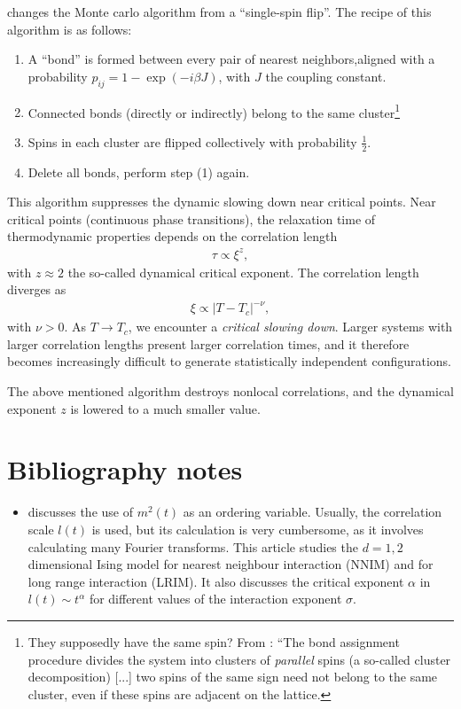 \cite{PhysRevLett.58.86} changes the Monte carlo
algorithm from a ``single-spin flip''. The recipe of this algorithm is as follows:

\begin{enumerate}
	\item A ``bond'' is formed between every pair of nearest neighbors,aligned with a probability $p_{ij} = 1 - \exp(-i\beta J)$, with $J$ the coupling constant.
	\item Connected bonds (directly or indirectly) belong to the same cluster\footnote{They supposedly have the same spin? From \cite{Luijten2006}: ``The bond assignment procedure divides the system into clusters of \textit{parallel} spins (a so-called cluster decomposition) [...] two spins of the same sign need not belong to the same cluster, even if these spins are adjacent on the lattice. }
	\item Spins in each cluster are flipped collectively with probability $\frac{1}{2}$. 
	\item Delete all bonds, perform step (1) again.
\end{enumerate}

This algorithm suppresses the dynamic slowing down near critical points. Near critical points (continuous phase transitions), the relaxation time of thermodynamic properties depends on the correlation length 
\begin{align}
	\tau \propto \xi ^z,
\end{align}
with $z\approx2$ the so-called dynamical critical exponent. The correlation length diverges as 
\begin{align}
	\xi \propto \lvert T - T_c \rvert ^{-\nu},
\end{align}
with $\nu > 0 $. As $T\to T_c$, we encounter a \textit{critical slowing down}. Larger systems with larger correlation lengths present larger correlation times, and it therefore becomes increasingly difficult to generate statistically independent configurations. 

The above mentioned algorithm destroys nonlocal correlations, and the dynamical exponent $z$ is lowered to a much smaller value. 


\section{Bibliography notes}%
\label{sec:Bibliography notes}

\begin{itemize}
	\item \cite{Janke2023} discusses the use of $m^2(t)$ as an ordering variable. Usually, the correlation scale  $l(t)$ is used, but its calculation is very cumbersome, as it involves calculating many Fourier transforms. This article studies the $d=1, 2$ dimensional Ising model for nearest neighbour interaction (NNIM) and for long range interaction (LRIM). It also discusses the critical exponent $\alpha$ in  $l(t) \sim t^\alpha$ for different values of the interaction exponent $\sigma$.
\end{itemize}

